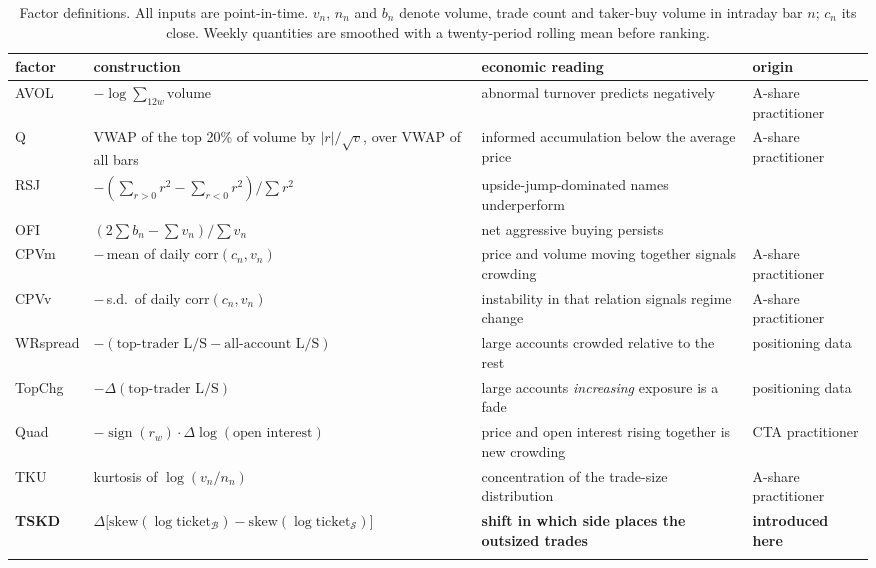 \documentclass[11pt,letterpaper]{article}
\begin{document}
\begin{table}[!htbp]\centering
\caption{Factor definitions. All inputs are point-in-time. $v_n$, $n_n$ and $b_n$
denote volume, trade count and taker-buy volume in intraday bar $n$; $c_n$ its
close. Weekly quantities are smoothed with a twenty-period rolling mean before
ranking.}\label{tab:factors}
\small
\begin{tabular}{p{}p{}p{}p{}}
\toprule\addlinespace[2pt]
factor & construction & economic reading & origin \\
\midrule\addlinespace[2pt]
AVOL & $-\log \sum_{12w} \text{volume}$ & abnormal turnover predicts negatively & A-share practitioner \\
Q & VWAP of the top 20\% of volume by $|r|/\sqrt{v}$, over VWAP of all bars & informed accumulation below the average price & A-share practitioner \\
RSJ & $-(\sum_{r>0} r^2 - \sum_{r<0} r^2)/\sum r^2$ & upside-jump-dominated names underperform & \citet{bns2010} \\
OFI & $(2\sum b_n - \sum v_n)/\sum v_n$ & net aggressive buying persists & \citet{crs2002} \\
CPVm & $-\,$mean of daily corr$(c_n, v_n)$ & price and volume moving together signals crowding & A-share practitioner \\
CPVv & $-\,$s.d.\ of daily corr$(c_n, v_n)$ & instability in that relation signals regime change & A-share practitioner \\
WRspread & $-(\text{top-trader L/S} - \text{all-account L/S})$ & large accounts crowded relative to the rest & positioning data \\
TopChg & $-\Delta(\text{top-trader L/S})$ & large accounts \emph{increasing} exposure is a fade & positioning data \\
Quad & $-\operatorname{sign}(r_w)\cdot\Delta\log(\text{open interest})$ & price and open interest rising together is new crowding & CTA practitioner \\
TKU & kurtosis of $\log(v_n/n_n)$ & concentration of the trade-size distribution & A-share practitioner \\
\textbf{TSKD} & $\Delta\big[\mathrm{skew}(\log \text{ticket}_{\mathcal{B}}) - \mathrm{skew}(\log \text{ticket}_{\mathcal{S}})\big]$ & \textbf{shift in which side places the outsized trades} & \textbf{introduced here} \\
\addlinespace[2pt]
\bottomrule
\end{tabular}
\normalsize
\end{table}
\end{document}
